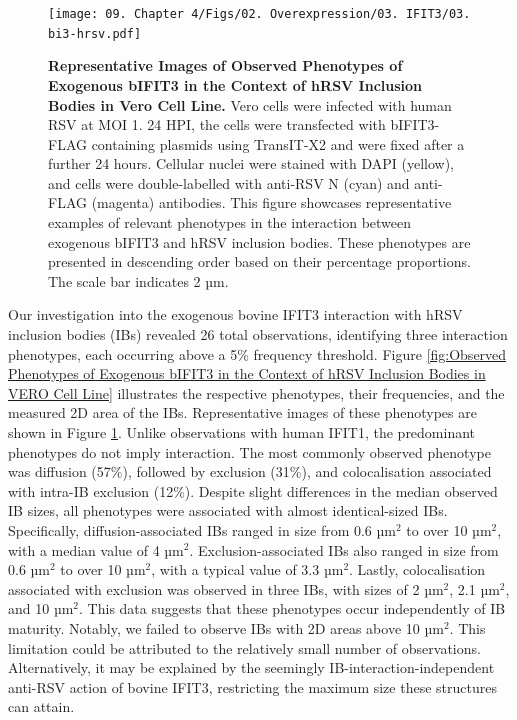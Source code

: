 \begin{figure}
    \centering
    \texttt{[image: 09. Chapter 4/Figs/02. Overexpression/03. IFIT3/03. bi3-hrsv.pdf]}
    \caption[Representative Images of Observed Phenotypes of Exogenous bIFIT3 in the Context of hRSV Inclusion Bodies in Vero Cell Line.]{\textbf{Representative Images of Observed Phenotypes of Exogenous bIFIT3 in the Context of hRSV Inclusion Bodies in Vero Cell Line.} Vero cells were infected with human RSV at MOI 1. 24 HPI, the cells were transfected with bIFIT3-FLAG containing plasmids using TransIT-X2 and were fixed after a further 24 hours. Cellular nuclei were stained with DAPI (yellow), and cells were double-labelled with anti-RSV N (cyan) and anti-FLAG (magenta) antibodies. This figure showcases representative examples of relevant phenotypes in the interaction between exogenous bIFIT3 and hRSV inclusion bodies. These phenotypes are presented in descending order based on their percentage proportions. The scale bar indicates 2 µm.}
    \label{fig:Representative Images of Observed Phenotypes of Exogenous bIFIT3 in the Context of hRSV Inclusion Bodies in VERO Cell Line}
\end{figure}

Our investigation into the exogenous bovine IFIT3 interaction with hRSV inclusion bodies (IBs) revealed 26 total observations, identifying three interaction phenotypes, each occurring above a 5\% frequency threshold. Figure \ref{fig:Observed Phenotypes of Exogenous bIFIT3 in the Context of hRSV Inclusion Bodies in VERO Cell Line} illustrates the respective phenotypes, their frequencies, and the measured 2D area of the IBs. Representative images of these phenotypes are shown in Figure \ref{fig:Representative Images of Observed Phenotypes of Exogenous bIFIT3 in the Context of hRSV Inclusion Bodies in VERO Cell Line}. Unlike observations with human IFIT1, the predominant phenotypes do not imply interaction. The most commonly observed phenotype was diffusion (57\%), followed by exclusion (31\%), and colocalisation associated with intra-IB exclusion (12\%). Despite slight differences in the median observed IB sizes, all phenotypes were associated with almost identical-sized IBs. Specifically, diffusion-associated IBs ranged in size from 0.6 \(\mbox{µm}^2\) to over 10 \(\mbox{µm}^2\), with a median value of 4 \(\mbox{µm}^2\). Exclusion-associated IBs also ranged in size from 0.6 \(\mbox{µm}^2\) to over 10 \(\mbox{µm}^2\), with a typical value of 3.3 \(\mbox{µm}^2\). Lastly, colocalisation associated with exclusion was observed in three IBs, with sizes of 2 \(\mbox{µm}^2\), 2.1 \(\mbox{µm}^2\), and 10 \(\mbox{µm}^2\). This data suggests that these phenotypes occur independently of IB maturity. Notably, we failed to observe IBs with 2D areas above 10 \(\mbox{µm}^2\). This limitation could be attributed to the relatively small number of observations. Alternatively, it may be explained by the seemingly IB-interaction-independent anti-RSV action of bovine IFIT3, restricting the maximum size these structures can attain.

